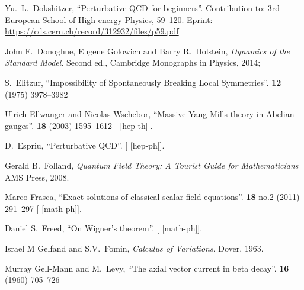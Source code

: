 \begin{thebibliography}{99}
Yu.~L.~Dokshitzer,
``Perturbative QCD for beginners''.
Contribution to: 3rd European School of High-energy Physics, 59--120.
Eprint: \url{https://cds.cern.ch/record/312932/files/p59.pdf}

John F.~Donoghue, Eugene Golowich and Barry R.~Holstein,
\textit{Dynamics of the Standard Model}.
Second ed., Cambridge Monographs in Physics, 2014;
{\tt{}}

S.~Elitzur,
``Impossibility of Spontaneously Breaking Local Symmetries''.
 \textbf{12} (1975) 3978--3982
{\tt{}}

Ulrich Ellwanger and Nicolas Wschebor,
``Massive Yang-Mills theory in Abelian gauges''.
 \textbf{18} (2003) 1595--1612
{\tt{}}
[ [hep-th]].

D.~Espriu,
``Perturbative QCD''.
[ [hep-ph]].

Gerald B.~Folland,
\textit{Quantum Field Theory: A Tourist Guide for Mathematicians}
AMS Press, 2008.

Marco Frasca,
``Exact solutions of classical scalar field equations''.
 \textbf{18} no.2 (2011) 291--297
{\tt{}}
[ [math-ph]].

Daniel S.~Freed,
``On Wigner's theorem''.
[ [math-ph]].

Israel M Gelfand and S.V.~Fomin,
\textit{Calculus of Variations}.
Dover, 1963.

Murray Gell-Mann and M.~Levy,
``The axial vector current in beta decay''.
 \textbf{16} (1960) 705--726
{\tt{}}


\end{thebibliography}
